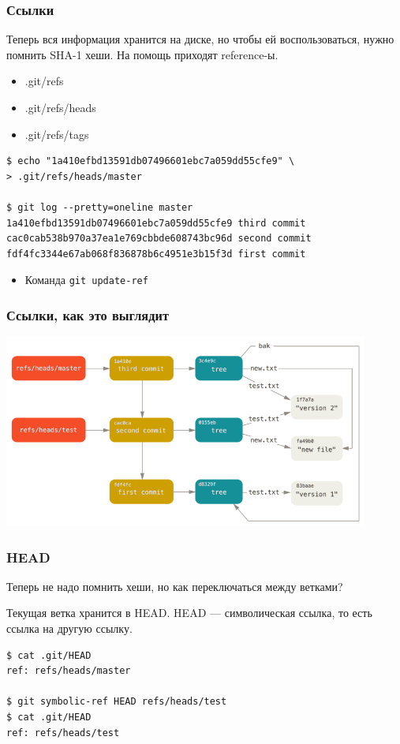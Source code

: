 \documentclass{../mcsslides}
\begin{document}
    \begin{frame}[fragile]
        \frametitle{Ссылки}
        Теперь вся информация хранится на диске, но чтобы ей воспользоваться, нужно помнить SHA-1 хеши. На помощь приходят reference-ы. 

        \begin{itemize}
            \item .git/refs
            \item .git/refs/heads
            \item .git/refs/tags
        \end{itemize}

        \begin{verbatim}
$ echo "1a410efbd13591db07496601ebc7a059dd55cfe9" \
> .git/refs/heads/master

$ git log --pretty=oneline master
1a410efbd13591db07496601ebc7a059dd55cfe9 third commit
cac0cab538b970a37ea1e769cbbde608743bc96d second commit
fdf4fc3344e67ab068f836878b6c4951e3b15f3d first commit
        \end{verbatim}
        \begin{itemize}
            \item Команда \verb|git update-ref|
        \end{itemize}
    \end{frame}

    \begin{frame}
        \frametitle{Ссылки, как это выглядит}
        \begin{center}
            \includegraphics[width=0.9\textwidth]{gitRefs.png}
        \end{center}
    \end{frame}

    \begin{frame}[fragile]
        \frametitle{HEAD}
        Теперь не надо помнить хеши, но как переключаться между ветками?

        Текущая ветка хранится в HEAD. HEAD --- символическая ссылка, то есть ссылка на другую ссылку.
        \begin{verbatim}
$ cat .git/HEAD
ref: refs/heads/master

$ git symbolic-ref HEAD refs/heads/test
$ cat .git/HEAD
ref: refs/heads/test
        \end{verbatim}
    \end{frame}
\end{document}
